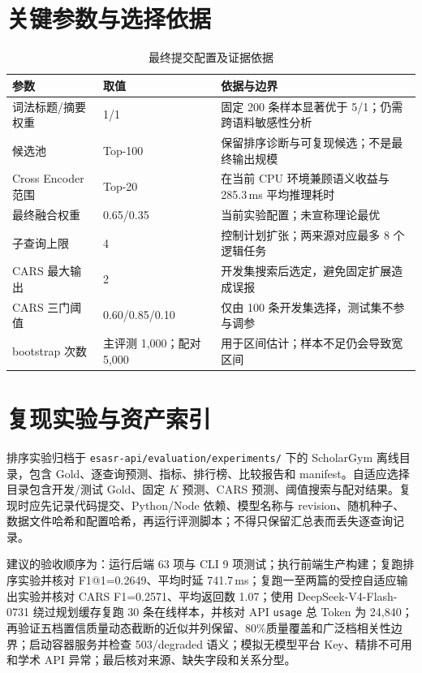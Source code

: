 \documentclass[a4paper,11pt,fontset=none]{ctexart}
\begin{document}
\section{关键参数与选择依据}

\begin{table}[H]
\centering
\caption{最终提交配置及证据依据}
\begin{tabularx}{\textwidth}{C{3.2cm} C{2.4cm} Y}
\toprule
\textbf{参数} & \textbf{取值} & \textbf{依据与边界} \\
\midrule
词法标题/摘要权重 & 1/1 & 固定 200 条样本显著优于 5/1；仍需跨语料敏感性分析 \\
候选池 & Top-100 & 保留排序诊断与可复现候选；不是最终输出规模 \\
Cross Encoder 范围 & Top-20 & 在当前 CPU 环境兼顾语义收益与 285.3\,ms 平均推理耗时 \\
最终融合权重 & 0.65/0.35 & 当前实验配置；未宣称理论最优 \\
子查询上限 & 4 & 控制计划扩张；两来源对应最多 8 个逻辑任务 \\
CARS 最大输出 & 2 & 开发集搜索后选定，避免固定扩展造成误报 \\
CARS 三门阈值 & 0.60/0.85/0.10 & 仅由 100 条开发集选择，测试集不参与调参 \\
bootstrap 次数 & 主评测 1,000；配对 5,000 & 用于区间估计；样本不足仍会导致宽区间 \\
\bottomrule
\end{tabularx}
\end{table}

\section{复现实验与资产索引}

排序实验归档于 \texttt{esasr-api/evaluation/experiments/} 下的 ScholarGym 离线目录，包含 Gold、逐查询预测、指标、排行榜、比较报告和 manifest。自适应选择目录包含开发/测试 Gold、固定 $K$ 预测、CARS 预测、阈值搜索与配对结果。复现时应先记录代码提交、Python/Node 依赖、模型名称与 revision、随机种子、数据文件哈希和配置哈希，再运行评测脚本；不得只保留汇总表而丢失逐查询记录。

建议的验收顺序为：运行后端 63 项与 CLI 9 项测试；执行前端生产构建；复跑排序实验并核对 F1@1=0.2649、平均时延 741.7\,ms；复跑一至两篇的受控自适应输出实验并核对 CARS F1=0.2571、平均返回数 1.07；使用 DeepSeek-V4-Flash-0731 绕过规划缓存复跑 30 条在线样本，并核对 API \texttt{usage} 总 Token 为 24,840；再验证五档置信质量动态截断的近似并列保留、80\%质量覆盖和广泛档相关性边界；启动容器服务并检查 503/degraded 语义；模拟无模型平台 Key、精排不可用和学术 API 异常；最后核对来源、缺失字段和关系分型。
\end{document}
